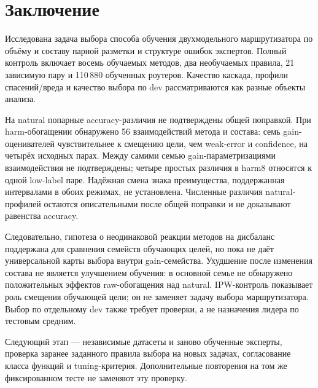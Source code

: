 \section{Заключение}
Исследована задача выбора способа обучения двухмодельного
маршрутизатора по объёму и составу парной разметки и структуре
ошибок экспертов. Полный контроль включает восемь обучаемых методов,
два необучаемых правила, 21 зависимую пару и 110\,880 обученных роутеров.
Качество каскада, профили спасений/вреда и качество выбора по dev
рассматриваются как разные объекты анализа.

На natural попарные accuracy-различия не подтверждены общей поправкой.
При harm-обогащении обнаружено 56 взаимодействий метода и состава:
семь gain-оценивателей чувствительнее к смещению цели, чем weak-error
и confidence, на четырёх исходных парах. Между самими семью
gain-параметризациями взаимодействия не подтверждены; четыре простых
различия в harm8 относятся к одной low-label паре. Надёжная смена
знака преимущества, поддержанная интервалами в обоих режимах,
не установлена. Численные различия natural-профилей остаются
описательными после общей поправки и не доказывают равенства accuracy.

Следовательно, гипотеза о неодинаковой реакции методов на дисбаланс
поддержана для сравнения семейств обучающих целей, но пока не даёт
универсальной карты выбора внутри gain-семейства. Ухудшение после
изменения состава не является улучшением обучения: в основной семье
не обнаружено положительных эффектов raw-обогащения над natural.
IPW-контроль показывает роль смещения обучающей цели; он не заменяет
задачу выбора маршрутизатора. Выбор по отдельному dev также требует
проверки, а не назначения лидера по тестовым средним.

Следующий этап --- независимые датасеты и заново обученные эксперты,
проверка заранее заданного правила выбора на новых задачах,
согласование класса функций и tuning-критерия. Дополнительные
повторения на том же фиксированном тесте не заменяют эту проверку.
